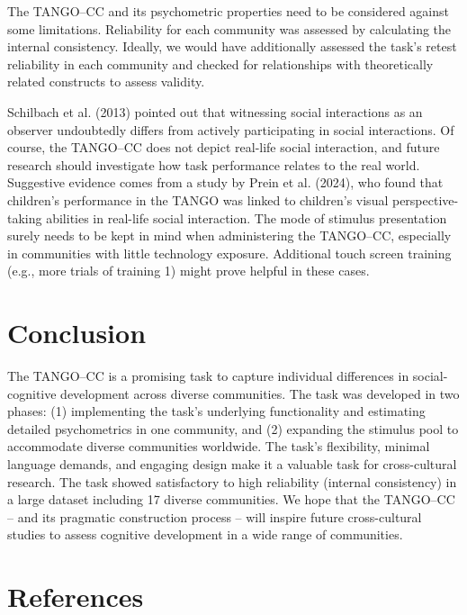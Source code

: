 \documentclass[
  man,floatsintext]{apa7}
\begin{document}
The TANGO--CC and its psychometric properties need to be considered against some limitations.
Reliability for each community was assessed by calculating the internal consistency.
Ideally, we would have additionally assessed the task's retest reliability in each community and checked for relationships with theoretically related constructs to assess validity.

Schilbach et al. (2013) pointed out that witnessing social interactions as an observer undoubtedly differs from actively participating in social interactions.
Of course, the TANGO--CC does not depict real-life social interaction, and future research should investigate how task performance relates to the real world.
Suggestive evidence comes from a study by Prein et al. (2024), who found that children's performance in the TANGO was linked to children's visual perspective-taking abilities in real-life social interaction.
The mode of stimulus presentation surely needs to be kept in mind when administering the TANGO--CC, especially in communities with little technology exposure.
Additional touch screen training (e.g., more trials of training 1) might prove helpful in these cases.

\section{Conclusion}\label{conclusion}

The TANGO--CC is a promising task to capture individual differences in social-cognitive development across diverse communities.
The task was developed in two phases: (1) implementing the task's underlying functionality and estimating detailed psychometrics in one community, and (2) expanding the stimulus pool to accommodate diverse communities worldwide.
The task's flexibility, minimal language demands, and engaging design make it a valuable task for cross-cultural research.
The task showed satisfactory to high reliability (internal consistency) in a large dataset including 17 diverse communities.
We hope that the TANGO--CC -- and its pragmatic construction process -- will inspire future cross-cultural studies to assess cognitive development in a wide range of communities.

\newpage

\section{References}\label{references}

\begingroup
\setlength{\parindent}{-0.5in}
\setlength{\leftskip}{0.5in}
\end{document}
